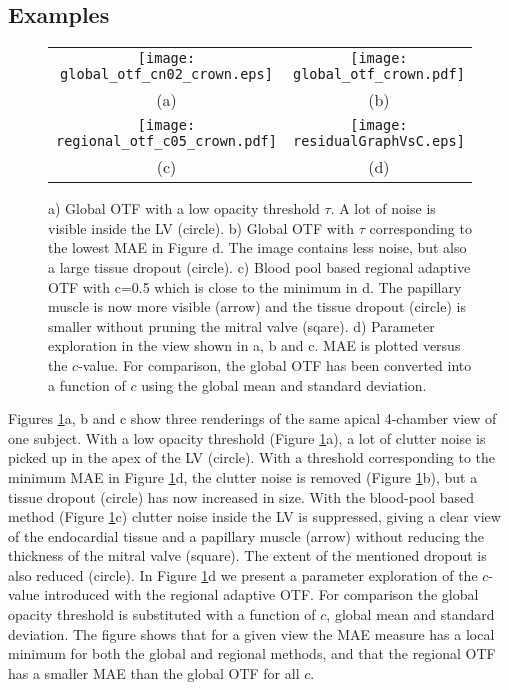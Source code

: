 \subsection{Examples}
\begin{figure}  
\begin{center}
\begin{tabular}{cc}
\texttt{[image: global\_otf\_cn02\_crown.eps]} & 
\texttt{[image: global\_otf\_crown.pdf]}\\
(a) & (b)\\
\texttt{[image: regional\_otf\_c05\_crown.pdf]} & 
\texttt{[image: residualGraphVsC.eps]}\\
(c) & (d)
\end{tabular}
\end{center}
\caption[example] { \label{fig:vis} a) Global OTF with a low opacity threshold $\tau$. A lot of noise is visible inside the LV (circle). b) Global OTF with $\tau$ corresponding to the lowest MAE in Figure d. The image contains less noise, but also a large tissue dropout (circle). c) Blood pool based regional adaptive OTF with c=0.5 which is close to the minimum in d. The papillary muscle is now more visible (arrow) and the tissue dropout (circle) is smaller without pruning the mitral valve (sqare).  d) Parameter exploration in the view shown in a, b and c. MAE is plotted versus the $c$-value. For comparison, the global OTF has been converted into a function of $c$ using the global mean and standard deviation.}
\end{figure} 

Figures \ref{fig:vis}a, b and c show three renderings of the same apical 4-chamber view of one subject. With a low opacity threshold (Figure \ref{fig:vis}a), a lot of clutter noise is picked up in the apex of the LV (circle). With a threshold corresponding to the minimum MAE in Figure \ref{fig:vis}d, the clutter noise is removed (Figure \ref{fig:vis}b), but a tissue dropout (circle) has now increased in size. With the blood-pool based method (Figure \ref{fig:vis}c) clutter noise inside the LV is suppressed, giving a clear view of the endocardial tissue and a papillary muscle (arrow) without reducing the thickness of the mitral valve (square). The extent of the mentioned dropout is also reduced (circle). In Figure \ref{fig:vis}d we present a parameter exploration of the $c$-value introduced with the regional adaptive OTF. For comparison the global opacity threshold is substituted with a function of $c$, global mean and standard deviation. The figure shows that for a given view the MAE measure has a local minimum for both the global and regional methods, and that the regional OTF has a smaller MAE than the global OTF for all $c$.

